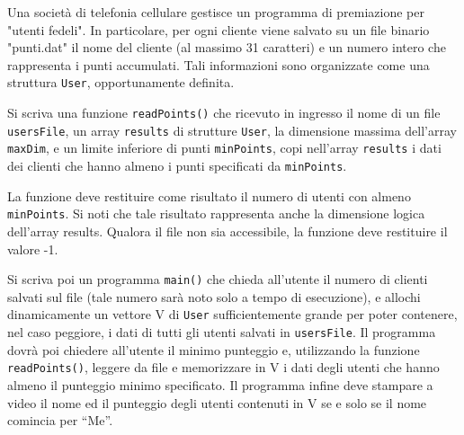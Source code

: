 \begin{Exercise}[label={ex:telefoni}]
    Una società di telefonia cellulare gestisce un programma di premiazione per "utenti fedeli". In particolare, per
    ogni cliente viene salvato su un file binario "punti.dat" il nome del cliente (al massimo 31 caratteri) e un
    numero intero che rappresenta i punti accumulati. Tali informazioni sono organizzate come una struttura \texttt{User}, opportunamente definita.

    Si scriva una funzione \texttt{readPoints()} che ricevuto in ingresso il nome di un file \texttt{usersFile}, un array \texttt{results} di
    strutture \texttt{User}, la dimensione massima dell’array \texttt{maxDim}, e un limite
    inferiore di punti \texttt{minPoints}, copi nell’array \texttt{results} i dati dei clienti che hanno almeno i punti specificati da \texttt{minPoints}.

    La funzione deve restituire come risultato il numero di utenti con almeno
    \texttt{minPoints}. Si noti che tale risultato rappresenta anche la dimensione
    logica dell’array results. Qualora il file non sia accessibile, la funzione deve restituire il valore -1.

    Si scriva poi un programma \texttt{main()} che chieda all’utente il numero
    di clienti salvati sul file (tale numero sarà noto solo a tempo di
    esecuzione), e allochi dinamicamente un vettore V di \texttt{User}
    sufficientemente grande per poter contenere, nel caso peggiore, i
    dati di tutti gli utenti salvati in \texttt{usersFile}. Il programma dovrà poi
    chiedere all’utente il minimo punteggio e, utilizzando la funzione
    \texttt{readPoints()}, leggere da file e memorizzare in V i dati degli
    utenti che hanno almeno il punteggio minimo specificato. Il
    programma infine deve stampare a video il nome ed il punteggio
    degli utenti contenuti in V se e solo se il nome comincia per “Me”.

\end{Exercise}

\begin{Answer}[ref={ex:telefoni}]
  	
\end{Answer}